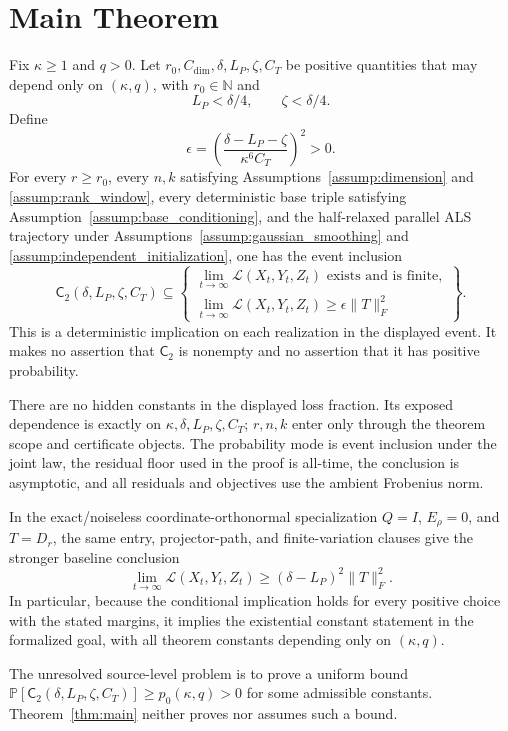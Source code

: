 \section{Main Theorem}\label{sec:main}

\begin{theorem}\label{thm:main}
Fix $\kappa\geq1$ and $q>0$.  Let
$r_0,C_{\mathrm{dim}},\delta,L_P,\zeta,C_T$ be positive quantities that
may depend only on $(\kappa,q)$, with $r_0\in\mathbb N$ and
\[
L_P<\delta/4,
\qquad
\zeta<\delta/4.
\]
Define
\[
\epsilon=
\left(\frac{\delta-L_P-\zeta}{\kappa^6C_T}\right)^2>0.
\]
For every $r\geq r_0$, every $n,k$ satisfying
Assumptions~\ref{assump:dimension} and \ref{assump:rank_window}, every
deterministic base triple satisfying
Assumption~\ref{assump:base_conditioning}, and the half-relaxed parallel ALS
trajectory under Assumptions~\ref{assump:gaussian_smoothing} and
\ref{assump:independent_initialization}, one has the event inclusion
\[
\mathsf C_2(\delta,L_P,\zeta,C_T)
\subseteq
\left\{
\begin{array}{l}
\displaystyle \lim_{t\to\infty}\mathcal L(X_t,Y_t,Z_t)
\text{ exists and is finite},\\[2mm]
\displaystyle \lim_{t\to\infty}\mathcal L(X_t,Y_t,Z_t)
\geq\epsilon\|T\|_F^2
\end{array}
\right\}.
\]
This is a deterministic implication on each realization in the displayed
event.  It makes no assertion that $\mathsf C_2$ is nonempty and no assertion
that it has positive probability.

There are no hidden constants in the displayed loss fraction.  Its exposed
dependence is exactly on $\kappa,\delta,L_P,\zeta,C_T$; $r,n,k$ enter only
through the theorem scope and certificate objects.  The probability mode is
event inclusion under the joint law, the residual floor used in the proof is
all-time, the conclusion is asymptotic, and all residuals and objectives use
the ambient Frobenius norm.

In the exact/noiseless coordinate-orthonormal specialization
$Q=I$, $E_\rho=0$, and $T=D_r$, the same entry, projector-path, and
finite-variation clauses give the stronger baseline conclusion
\[
\lim_{t\to\infty}\mathcal L(X_t,Y_t,Z_t)
\geq(\delta-L_P)^2\|T\|_F^2.
\]
In particular, because the conditional implication holds for every positive
choice with the stated margins, it implies the existential constant statement
in the formalized goal, with all theorem constants depending only on
$(\kappa,q)$.
\end{theorem}

The unresolved source-level problem is to prove a uniform bound
$\mathbb P[\mathsf C_2(\delta,L_P,\zeta,C_T)]\geq p_0(\kappa,q)>0$ for
some admissible constants.  Theorem~\ref{thm:main} neither proves nor assumes
such a bound.
